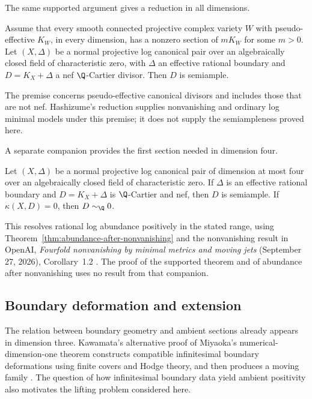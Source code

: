 The same supported argument gives a reduction in all dimensions.
\begin{theorem}
\label{bl:thm:conditional}
Assume that every smooth connected projective complex variety $W$ with
pseudo-effective $K_W$, in every dimension, has a nonzero section of
$mK_W$ for some $m>0$. Let $(X,\Delta)$ be a normal projective
log canonical pair over an algebraically closed field of characteristic
zero, with $\Delta$ an effective rational boundary and
$D=K_X+\Delta$ a nef $\Q$-Cartier divisor. Then $D$ is semiample.
\end{theorem}
The premise concerns pseudo-effective canonical divisors and includes
those that are not nef. Hashizume's reduction supplies nonvanishing
and ordinary log minimal models under this premise; it does not
supply the semiampleness proved here.

A separate companion provides the first section needed in dimension four.
\begin{corollary}\label{thm:full-abundance}
Let $(X,\Delta)$ be a normal projective log canonical pair of dimension
at most four over an algebraically closed field of characteristic zero.
If $\Delta$ is an effective rational boundary and $D=K_X+\Delta$ is
$\Q$-Cartier and nef, then $D$ is semiample. If $\kappa(X,D)=0$,
then $D\sim_{\Q}0$.
\end{corollary}
This resolves rational log abundance positively in the stated range,
using Theorem~\ref{thm:abundance-after-nonvanishing} and the nonvanishing
result in OpenAI, \emph{Fourfold nonvanishing by minimal metrics and moving jets}
(September 27, 2026), Corollary~1.2
\cite{OpenAINonvanishing2026}. The proof of the supported theorem and
of abundance after nonvanishing uses no result from that companion.

\subsection*{Boundary deformation and extension}

The relation between boundary geometry and ambient sections already
appears in dimension three. Kawamata's alternative proof of Miyaoka's
numerical-dimension-one theorem constructs compatible infinitesimal
boundary deformations using finite covers and Hodge theory, and then
produces a moving family \cite[Section 4]{Kawamata1992}. The question
of how infinitesimal boundary data yield ambient positivity also
motivates the lifting problem considered here.

